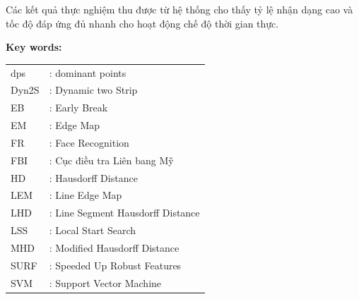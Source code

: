 Các kết quả thực nghiệm thu được từ hệ thống cho thấy tỷ lệ nhận dạng cao và tốc độ đáp ứng đủ nhanh cho hoạt động chế độ thời gian thực.

\newpage
\thispagestyle{abstract}
\begin{center}
{}
\end{center}



\textbf{Key words:} 

\newpage
{}
{\fontsize{12pt}{5pt}\selectfont
\tableofcontents}


\newpage
{}
\listoffigures


\newpage
{}
\listoftables


\newpage
\thispagestyle{danhmucviettat}
{}

\FloatBarrier
\begin{table}[h]
\centering
\captionsetup{list=no}
\begin{center}
\begin{tabularx}{\columnwidth}{XX}
dps & : dominant points \\
Dyn2S & : Dynamic two Strip \\
EB & : Early Break \\
EM & : Edge Map \\
FR & : Face Recognition \\
FBI & : Cục điều tra Liên bang Mỹ \\
HD & : Hausdorff Distance \\
LEM & : Line Edge Map \\
LHD & : Line Segment Hausdorff Distance \\
LSS & : Local Start Search \\
MHD & : Modified Hausdorff Distance \\
SURF & : Speeded Up Robust Features \\
SVM & : Support Vector Machine 
 

\end{tabularx}
\end{center}
\end{table}
\FloatBarrier